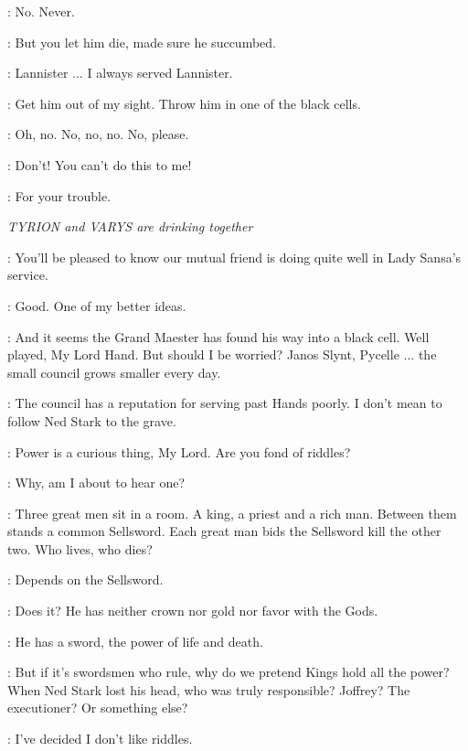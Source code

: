 \PYCELLE: No. Never. 

\TYRION: But you let him die, made sure he succumbed. 

\PYCELLE: Lannister $\ldots$ I always served Lannister. 

\TYRION: Get him out of my sight. Throw him in one of the black cells. 

\PYCELLE: Oh, no. No, no, no. No, please. 


\PYCELLE: Don't! You can't do this to me! 


\TYRION: For your trouble. 


\scene

\textit{TYRION and VARYS are drinking together} 

\VARYS: You'll be pleased to know our mutual friend is doing quite well in Lady Sansa's service. 

\TYRION: Good. One of my better ideas. 

\VARYS: And it seems the Grand Maester has found his way into a black cell. Well played, My Lord Hand. But should I be worried? Janos Slynt, Pycelle $\ldots$ the small council grows smaller every day. 

\TYRION: The council has a reputation for serving past Hands poorly. I don't mean to follow Ned Stark to the grave. 

\VARYS: Power is a curious thing, My Lord. Are you fond of riddles? 

\TYRION: Why, am I about to hear one? 

\VARYS: Three great men sit in a room. A king, a priest and a rich man. Between them stands a common Sellsword. Each great man bids the Sellsword kill the other two. Who lives, who dies? 

\TYRION: Depends on the Sellsword. 

\VARYS: Does it? He has neither crown nor gold nor favor with the Gods. 

\TYRION: He has a sword, the power of life and death. 

\VARYS: But if it's swordsmen who rule, why do we pretend Kings hold all the power? When Ned Stark lost his head, who was truly responsible? Joffrey? The executioner? Or something else? 

\TYRION: I've decided I don't like riddles. 


